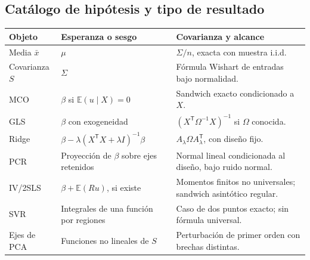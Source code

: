\documentclass[11pt,a4paper]{article}
\newcommand{\E}{\mathbb E}
\newcommand{\T}{^{\mathsf T}}
\theoremstyle{definition}
\begin{document}
\subsection{Catálogo de hipótesis y tipo de resultado}
\begin{center}\small
\begin{tabular}{>{\raggedright\arraybackslash}p{2.8cm}>{\raggedright\arraybackslash}p{6.6cm}>{\raggedright\arraybackslash}p{5.9cm}}\toprule
Objeto & Esperanza o sesgo & Covarianza y alcance\\\midrule
Media $\bar x$ & $\mu$ & $\Sigma/n$, exacta con muestra i.i.d.\\
Covarianza $S$ & $\Sigma$ & Fórmula Wishart de entradas bajo normalidad.\\
MCO & $\beta$ si $\E(u\mid X)=0$ & Sandwich exacto condicionado a $X$.\\
GLS & $\beta$ con exogeneidad & $(X\T\Omega^{-1}X)^{-1}$ si $\Omega$ conocida.\\
Ridge & $\beta-\lambda(X\T X+\lambda I)^{-1}\beta$ & $A_\lambda\Omega A_\lambda\T$, con diseño fijo.\\
PCR & Proyección de $\beta$ sobre ejes retenidos & Normal lineal condicionada al diseño, bajo ruido normal.\\
IV/2SLS & $\beta+\E(Ru)$, si existe & Momentos finitos no universales; sandwich asintótico regular.\\
SVR & Integrales de una función por regiones & Caso de dos puntos exacto; sin fórmula universal.\\
Ejes de PCA & Funciones no lineales de $S$ & Perturbación de primer orden con brechas distintas.\\\bottomrule
\end{tabular}
\end{center}
\end{document}

